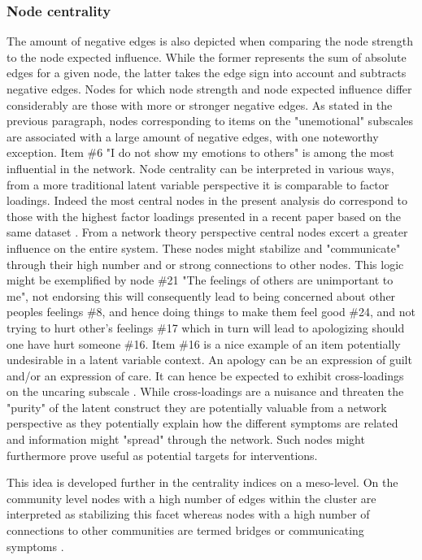 \subsubsection{Node centrality}
The amount of negative edges is also depicted when comparing the node strength to the node expected influence. 
While the former represents the sum of absolute edges for a given node, the latter takes the edge sign into account and subtracts negative edges. 
Nodes for which node strength and node expected influence differ considerably are those with more or stronger negative edges.
As stated in the previous paragraph, nodes corresponding to items on the "unemotional" subscales are associated with a large amount of negative edges, with one noteworthy exception.
Item \#6 "I do not show my emotions to others" is among the most influential in the network.
Node centrality can be interpreted in various ways, from a more traditional latent variable perspective it is comparable to factor loadings. 
Indeed the most central nodes in the present analysis do correspond to those with the highest factor loadings presented in a recent paper based on the same dataset
\parencite{kliem_factor_2019}.
From a network theory perspective central nodes excert a greater influence on the entire system. 
These nodes might stabilize and "communicate" through their high number and or strong connections to other nodes.
This logic might be exemplified by node \#21 "The feelings of others are unimportant to me", 
not endorsing this will consequently lead to being concerned about other peoples feelings \#8,
and hence doing things to make them feel good \#24,
and not trying to hurt other's feelings \#17 which in turn will lead to apologizing should one have hurt someone \#16.
Item \#16 is a nice example of an item potentially undesirable in a latent variable context. 
An apology can be an expression of guilt and/or an expression of care. 
It can hence be expected to exhibit cross-loadings on the uncaring subscale \parencite{essau_callous-unemotional_2006}.
While cross-loadings are a  nuisance and threaten the "purity" of the latent construct they are potentially valuable from a network perspective as they potentially explain how the different symptoms are related
and information might "spread" through the network. 
Such nodes might furthermore prove useful as potential targets for interventions.

This idea is developed further in the centrality indices on a meso-level.
On the community level nodes with a high number of edges within the cluster are interpreted as stabilizing this facet whereas nodes with a high number of connections to other communities are termed
bridges \parencite{robinaugh_identifying_2016} or communicating symptoms \parencite{blanken_role_2018}.

